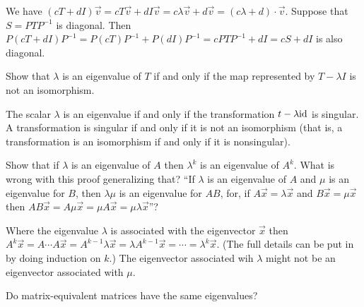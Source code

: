 \begin{exercises}
    \begin{answer}
      \begin{exparts}
        \partsitem We have 
          $(cT+dI)\vec{v}=cT\vec{v}+dI\vec{v}=c\lambda\vec{v}+d\vec{v}
               =(c\lambda+d)\cdot \vec{v}$.
        \partsitem Suppose that $S=PTP^{-1}$ is diagonal.
          Then $P(cT+dI)P^{-1}=P(cT)P^{-1}+P(dI)P^{-1}
                 =cPTP^{-1}+dI=cS+dI$ is also diagonal.
      \end{exparts}
    \end{answer}
  \recommended \item
    Show that \( \lambda \) is an eigenvalue of \( T \) if and only if the map
    represented by \( T-\lambda I \) is not an isomorphism.
    \begin{answer}
      The scalar $\lambda$ is an eigenvalue if and only if the transformation
      $t-\lambda \mbox{id}$ is singular.
      A transformation is singular if and only if it is not an isomorphism
      (that is, a transformation is an isomorphism if and only if it is
      nonsingular).
    \end{answer}
  \item \cite{Strang} 
    \begin{exparts}
      \partsitem Show that if \( \lambda \) is an eigenvalue of \( A \)
         then \( \lambda^k \) is an eigenvalue of \( A^k \).
      \partsitem What is wrong with this proof generalizing that?
         ``If \( \lambda \) is an eigenvalue of \( A \) and \( \mu \) is
         an eigenvalue for \( B \), then \( \lambda\mu \) is an eigenvalue
         for \( AB \), for, if \( A\vec{x}=\lambda\vec{x} \) and
         \( B\vec{x}=\mu\vec{x} \) then
         \( AB\vec{x}=A\mu\vec{x}=\mu A\vec{x}=\mu\lambda\vec{x} \)''?
    \end{exparts}
    \begin{answer}
      \begin{exparts}
        \partsitem Where the eigenvalue $\lambda$ is associated with the
          eigenvector $\vec{x}$ then
          $A^k\vec{x}=A\cdots A\vec{x}=A^{k-1}\lambda\vec{x}
            =\lambda A^{k-1}\vec{x}=\cdots=\lambda^k\vec{x}$.
          (The full details can be put in by doing induction on $k$.)
        \partsitem The eigenvector associated wih $\lambda$
          might not be an eigenvector associated with $\mu$.
      \end{exparts}
    \end{answer}
  \item 
    Do matrix-equivalent matrices have the same eigenvalues?

\end{exercises}
